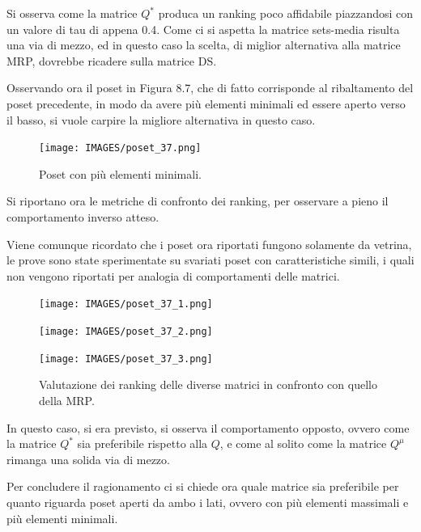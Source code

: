\documentclass{report}
\begin{document}
Si osserva come la matrice $Q^*$ produca un ranking poco affidabile piazzandosi con un valore di tau di appena 0.4. Come ci si aspetta la matrice sets-media risulta una via di mezzo, ed in questo caso la scelta, di miglior alternativa alla matrice MRP, dovrebbe ricadere sulla matrice DS.


Osservando ora il poset in Figura 8.7, che di fatto corrisponde al ribaltamento del poset precedente, in modo da avere più elementi minimali ed essere aperto verso il basso, si vuole carpire la migliore alternativa in questo caso.

\begin{figure}[H]
    \centering
    \texttt{[image: IMAGES/poset\_37.png]}
    \caption{Poset con più elementi minimali.}
    \label{fig:roc}
\end{figure}

Si riportano ora le metriche di confronto dei ranking, per osservare a pieno il comportamento inverso atteso. 

Viene comunque ricordato che i poset ora riportati fungono solamente da vetrina, le prove sono state sperimentate su svariati poset con caratteristiche simili, i quali non vengono riportati per analogia di comportamenti delle matrici.

\begin{figure}[H]
  \centering
  \begin{minipage}[b]{0.4\textwidth}
    \texttt{[image: IMAGES/poset\_37\_1.png]}
  \end{minipage}
  \hfill
  \begin{minipage}[b]{0.4\textwidth}
    \texttt{[image: IMAGES/poset\_37\_2.png]}
  \end{minipage}
  \hfill
  \begin{minipage}[b]{0.4\textwidth}
    \texttt{[image: IMAGES/poset\_37\_3.png]}
  \end{minipage}
  \caption{Valutazione dei ranking delle diverse matrici in confronto con quello della MRP.}
\end{figure}

In questo caso, si era previsto, si osserva il comportamento opposto, ovvero come la matrice $Q^*$ sia preferibile rispetto alla $Q$, e come al solito come la matrice $Q^{\mu}$ rimanga una solida via di mezzo.


Per concludere il ragionamento ci si chiede ora quale matrice sia preferibile per quanto riguarda poset aperti da ambo i lati, ovvero con più elementi massimali e più elementi minimali. 
\end{document}
